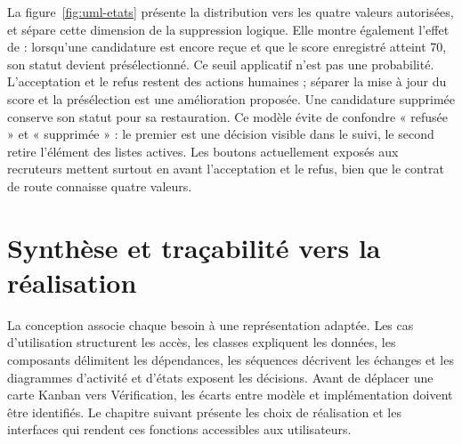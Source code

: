 La figure~\ref{fig:uml-etats} présente la distribution vers les quatre valeurs autorisées, et sépare cette dimension de la suppression logique. Elle montre également l'effet de  : lorsqu'une candidature est encore reçue et que le score enregistré atteint 70, son statut devient présélectionné. Ce seuil applicatif n'est pas une probabilité. L'acceptation et le refus restent des actions humaines ; séparer la mise à jour du score et la présélection est une amélioration proposée. Une candidature supprimée conserve son statut pour sa restauration. Ce modèle évite de confondre « refusée » et « supprimée » : le premier est une décision visible dans le suivi, le second retire l'élément des listes actives. Les boutons actuellement exposés aux recruteurs mettent surtout en avant l'acceptation et le refus, bien que le contrat de route connaisse quatre valeurs.

\section{Synthèse et traçabilité vers la réalisation}
La conception associe chaque besoin à une représentation adaptée. Les cas d'utilisation structurent les accès, les classes expliquent les données, les composants délimitent les dépendances, les séquences décrivent les échanges et les diagrammes d'activité et d'états exposent les décisions. Avant de déplacer une carte Kanban vers Vérification, les écarts entre modèle et implémentation doivent être identifiés. Le chapitre suivant présente les choix de réalisation et les interfaces qui rendent ces fonctions accessibles aux utilisateurs.
